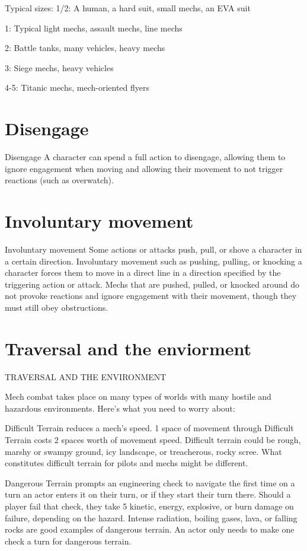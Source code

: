 Typical sizes:
1/2: A human, a hard suit, small mechs, an EVA suit

1: Typical light mechs, assault mechs, line mechs

2: Battle tanks, many vehicles, heavy mechs

3: Siege mechs, heavy vehicles

4-5: Titanic mechs, mech-oriented flyers

\section{Disengage}
                                               Disengage
A character can spend a full action to disengage, allowing them to ignore engagement when
moving and allowing their movement to not trigger reactions (such as overwatch).
\section{Involuntary movement}
                                      Involuntary movement
Some actions or attacks push, pull, or shove a character in a certain direction. Involuntary
movement such as pushing, pulling, or knocking a character forces them to move in a direct line
in a direction specified by the triggering action or attack. Mechs that are pushed, pulled, or
knocked around do not provoke reactions and ignore engagement with their movement, though
they must still obey obstructions.


\section{Traversal and the enviorment}
                          TRAVERSAL AND THE ENVIRONMENT

Mech combat takes place on many types of worlds with many hostile and hazardous
environments. Here’s what you need to worry about:





Difficult Terrain reduces a mech’s speed. 1 space of movement through Difficult Terrain costs 2
spaces worth of movement speed. Difficult terrain could be rough, marshy or swampy ground,
icy landscape, or treacherous, rocky scree. What constitutes difficult terrain for pilots and mechs
might be different.


Dangerous Terrain prompts an engineering check to navigate the first time on a turn an actor
enters it on their turn, or if they start their turn there. Should a player fail that check, they take 5
kinetic, energy, explosive, or burn damage on failure, depending on the hazard. Intense radiation,
boiling gases, lava, or falling rocks are good examples of dangerous terrain. An actor only needs
to make one check a turn for dangerous terrain.


